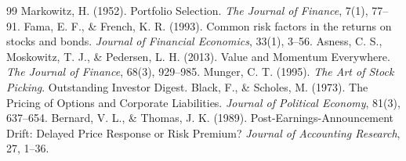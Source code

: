 \documentclass[11pt]{article}
\begin{document}
\begin{thebibliography}{99}
 Markowitz, H. (1952). Portfolio Selection. \textit{The Journal of Finance}, 7(1), 77--91.
 Fama, E. F., \& French, K. R. (1993). Common risk factors in the returns on stocks and bonds. \textit{Journal of Financial Economics}, 33(1), 3--56.
 Asness, C. S., Moskowitz, T. J., \& Pedersen, L. H. (2013). Value and Momentum Everywhere. \textit{The Journal of Finance}, 68(3), 929--985.
 Munger, C. T. (1995). \textit{The Art of Stock Picking}. Outstanding Investor Digest.
 Black, F., \& Scholes, M. (1973). The Pricing of Options and Corporate Liabilities. \textit{Journal of Political Economy}, 81(3), 637--654.
 Bernard, V. L., \& Thomas, J. K. (1989). Post-Earnings-Announcement Drift: Delayed Price Response or Risk Premium? \textit{Journal of Accounting Research}, 27, 1--36.
\end{thebibliography}
\end{document}
